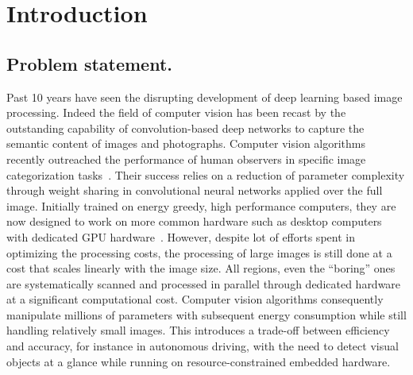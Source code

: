 \section*{Introduction}
\label{sec:intro}
\subsection*{Problem statement.}


Past 10 years have seen the disrupting development of deep learning based image processing. 
Indeed the field of computer vision has been recast by the outstanding capability of convolution-based deep networks to capture the semantic content of images and photographs. Computer vision algorithms recently outreached the performance of human observers in specific image categorization tasks~\cite{He15}. Their success relies on a reduction of parameter complexity through weight sharing  in convolutional neural networks applied over the full image. 
Initially trained on energy greedy, high performance computers, they are now designed to work on more common hardware such as desktop computers with dedicated GPU hardware~\cite{Sandler18}.
However, despite lot of efforts spent in optimizing the processing costs, the processing of large images is still done at a cost that scales linearly with the image size. All regions, even the “boring” ones are systematically scanned and processed in parallel through dedicated hardware at a significant computational cost.
Computer vision algorithms consequently manipulate millions of parameters with subsequent energy consumption while still handling relatively small images. This introduces a trade-off between efficiency and accuracy, for instance in autonomous driving, with the need to detect visual objects at a glance while running on resource-constrained embedded hardware. 

